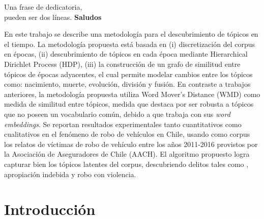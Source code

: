 \documentclass[letterpaper,12pt,oneside]{book} %
\begin{document}



\begin{dedicatoria}
	Una frase de dedicatoria, \\
	pueden ser dos líneas. \newp
	\textbf{Saludos}
\end{dedicatoria}

\begin{agradecimientos}
\end{agradecimientos}



\begin{resumen}
    En este trabajo se describe una metodología para el descubrimiento de tópicos en el tiempo. La metodología propuesta está basada en (i) discretización del corpus en épocas, (ii) descubrimiento de tópicos en cada época mediante Hierarchical Dirichlet Process (HDP), (iii) la construcción de un grafo de similitud entre tópicos de épocas adyacentes, el cual permite modelar cambios entre los tópicos como: nacimiento, muerte, evolución, división y fusión. En contraste a trabajos anteriores, la metodología propuesta utiliza Word Mover's Distance (WMD) como medida de similitud entre tópicos, medida que destaca por ser robusta a tópicos que no poseen un vocabulario común, debido a que trabaja con sus \textit{word embeddings}. Se reportan resultados experimentales tanto cuantitativos como cualitativos en el fenómeno de robo de vehículos en Chile, usando como corpus los relatos de víctimas de robo de vehículo entre los años 2011-2016 provistos por la Asociación de Aseguradores de Chile (AACH). El algoritmo propuesto logra capturar bien los tópicos latentes del corpus, descubriendo delitos tales como , apropiación indebida y robo con violencia.
\end{resumen}


\hypersetup{
    citecolor=Blue
}

\listoftodos
\chapter{Introducción}
\end{document}
